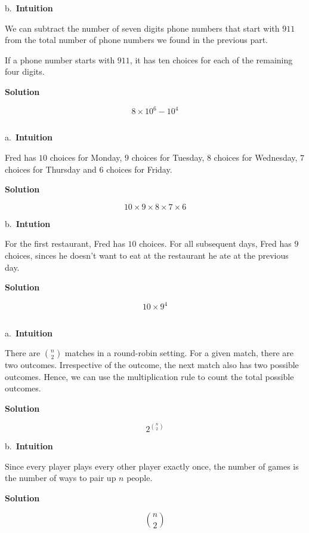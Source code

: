 \documentclass[]{book}
\begin{document}
b.~\textbf{Intuition}

We can subtract the number of seven digits phone numbers that start with
\(911\) from the total number of phone numbers we found in the previous
part.

If a phone number starts with \(911\), it has ten choices for each of
the remaining four digits.

 \textbf{Solution}

\[ 8 \times 10^{6} - 10^{4} \]

\subsection{}\label{section-2}

a.~\textbf{Intuition}

Fred has \(10\) choices for Monday, \(9\) choices for Tuesday, \(8\)
choices for Wednesday, \(7\) choices for Thursday and \(6\) choices for
Friday.

 \textbf{Solution}

\[ 10 \times 9 \times 8 \times 7 \times 6 \]

b.~\textbf{Intution}

For the first restaurant, Fred has \(10\) choices. For all subsequent
days, Fred has \(9\) choices, sinces he doesn't want to eat at the
restaurant he ate at the previous day.

 \textbf{Solution}

\[ 10 \times 9^{4} \]

\subsection{}\label{section-3}

a.~\textbf{Intuition}

There are \({n \choose 2}\) matches in a round-robin setting. For a
given match, there are two outcomes. Irrespective of the outcome, the
next match also has two possible outcomes. Hence, we can use the
multiplication rule to count the total possible outcomes.

 \textbf{Solution}

\[ 2^{{n \choose 2}} \]

b.~\textbf{Intuition}

Since every player plays every other player exactly once, the number of
games is the number of ways to pair up \(n\) people.

 \textbf{Solution}

\[ {n \choose 2} \]
\end{document}
